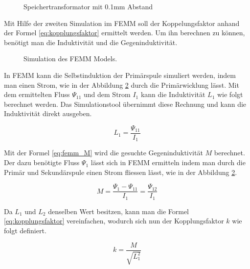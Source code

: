 \begin{figure}[h]
	\centering
	\qquad
	\caption{Speichertransformator mit 0.1mm Abstand}
	\label{fig:saettigung}
\end{figure}
\newpage

Mit Hilfe der zweiten Simulation im FEMM soll der Koppelungsfaktor anhand der Formel \ref{eq:kopplungsfaktor} ermittelt werden. Um ihn berechnen zu können, benötigt man die Induktivität und die Gegeninduktivität.

\begin{figure}[H]
	\centering
	\qquad
	\caption{Simulation des FEMM Models.}
	\label{fig:femmkopplung}
\end{figure}

In FEMM kann die Selbstinduktion der Primärspule simuliert werden, indem man einen Strom, wie in der Abbildung \ref{fig:femmkopplung} durch die Primärwicklung lässt. Mit dem ermittelten Fluss $ \Psi_{11}  $ und dem Strom $ I_{1} $ kann die Induktivität $ L_{1} $ wie folgt berechnet werden. Das Simulationstool übernimmt diese Rechnung und kann die Induktivität direkt ausgeben.\cite{femm}

\begin{equation}
L_{1}=\frac{\Psi_{11}}{I_{1}}
\label{eq:femm_l1}
\end{equation}

Mit der Formel \ref{eq:femm_M} wird die gesuchte Gegeninduktivität $ M $ berechnet.
Der dazu benötigte Fluss $ \Psi_{1} $ lässt sich in FEMM ermitteln indem man durch die Primär und Sekundärspule einen Strom fliessen lässt, wie in der Abbildung \ref{fig:femmkopplung}. \cite{femm}

\begin{equation}
M=\frac{\Psi_{1}-\Psi_{11}}{I_{1}}=\frac{\Psi_{12}}{I_{1}}
\label{eq:femm_M}
\end{equation}

Da $ L_{1} $ und $ L_{2} $ denselben Wert besitzen, kann man die Formel \ref{eq:kopplungsfaktor} vereinfachen, wodurch sich nun der Kopplungsfaktor $ k $ wie folgt definiert.

\begin{equation}
k=\frac{M}{\sqrt{L_{1}^{2}}}
\label{eq:kopplungsfaktor_neu}
\end{equation}

